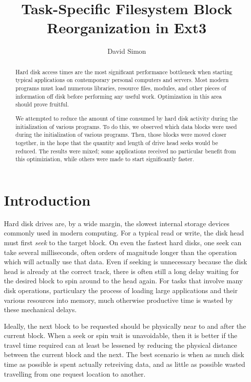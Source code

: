 \documentclass[10pt,twocolumn]{article}
\author{David Simon}
\title{Task-Specific Filesystem Block Reorganization in Ext3}
\begin{document}
\maketitle

\begin{abstract}
Hard disk access times are the most significant performance bottleneck when
starting typical applications on contemporary personal computers and servers.
Most modern programs must load numerous libraries, resource files, modules, and
other pieces of information off disk before performing any useful work. Optimization
in this area should prove fruitful.

We attempted to reduce the amount of time consumed by hard disk activity during
the initialization of various programs. To do this, we observed which data blocks were
used during the initialization of various programs. Then, those blocks were moved
closer together, in the hope that the quantity and length of drive head seeks
would be reduced. The results were mixed; some applications received no particular
benefit from this optimiziation, while others were made to start significantly faster.
\end{abstract}

\section{Introduction}

Hard disk drives are, by a wide margin, the slowest internal storage devices commonly
used in modern computing. For a typical read or write, the disk head must first
\emph{seek} to the target block\cite{seektime}. On even the fastest hard disks\cite{deskstar}, one seek
can take several milliseconds, often orders of magnitude longer than the operation which will actually
use that data. Even if seeking is unnecessary because the disk head is already at the correct track, there is
often still a long delay waiting for the desired block to spin around to the head again\cite{latency}. For
tasks that involve many disk operations, particulary the process of loading large applications and their various
resources into memory, much otherwise productive time is wasted by these mechanical delays.

Ideally, the next block to be requested should be physically near to
and after the current block\cite{autolocality}. When a seek or
spin wait is unavoidable, then it is better if the travel time required can at least be lessened by reducing the
physical distance between the current block and the next. The best scenario is when
as much disk time as possible is spent actually retreiving data, and as little as possible
wasted travelling from one request location to another.
\end{document}
